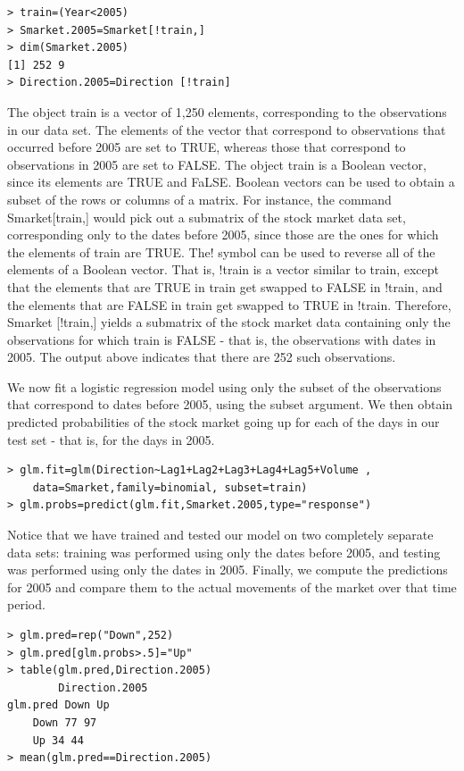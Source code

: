 \documentclass[10pt]{article}
\begin{document}
\begin{verbatim}
> train=(Year<2005)
> Smarket.2005=Smarket[!train,]
> dim(Smarket.2005)
[1] 252 9
> Direction.2005=Direction [!train]
\end{verbatim}

The object train is a vector of 1,250 elements, corresponding to the observations in our data set. The elements of the vector that correspond to observations that occurred before 2005 are set to TRUE, whereas those that correspond to observations in 2005 are set to FALSE. The object train is a Boolean vector, since its elements are TRUE and FaLSE. Boolean vectors can be used to obtain a subset of the rows or columns of a matrix. For instance, the command Smarket[train,] would pick out a submatrix of the stock market data set, corresponding only to the dates before 2005, since those are the ones for which the elements of train are TRUE. The! symbol can be used to reverse all of the elements of a Boolean vector. That is, !train is a vector similar to train, except that the elements that are TRUE in train get swapped to FALSE in !train, and the elements that are FALSE in train get swapped to TRUE in !train. Therefore, Smarket [!train,] yields a submatrix of the stock market data containing only the observations for which train is FALSE - that is, the observations with dates in 2005. The output above indicates that there are 252 such observations.

We now fit a logistic regression model using only the subset of the observations that correspond to dates before 2005, using the subset argument. We then obtain predicted probabilities of the stock market going up for each of the days in our test set - that is, for the days in 2005.

\begin{verbatim}
> glm.fit=glm(Direction~Lag1+Lag2+Lag3+Lag4+Lag5+Volume ,
    data=Smarket,family=binomial, subset=train)
> glm.probs=predict(glm.fit,Smarket.2005,type="response")
\end{verbatim}

Notice that we have trained and tested our model on two completely separate data sets: training was performed using only the dates before 2005, and testing was performed using only the dates in 2005. Finally, we compute the predictions for 2005 and compare them to the actual movements of the market over that time period.

\begin{verbatim}
> glm.pred=rep("Down",252)
> glm.pred[glm.probs>.5]="Up"
> table(glm.pred,Direction.2005)
        Direction.2005
glm.pred Down Up
    Down 77 97
    Up 34 44
> mean(glm.pred==Direction.2005)
\end{verbatim}
\end{document}
